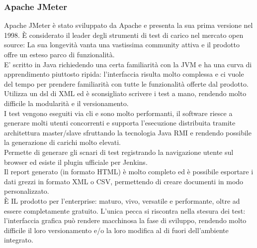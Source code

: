 \subsubsection{Apache JMeter}
Apache JMeter è stato sviluppato da Apache e presenta la sua prima versione nel 1998. È considerato il leader degli strumenti di test di carico nel mercato open source: La sua longevità vanta una vastissima community attiva e il prodotto offre un esteso parco di funzionalità.\\ 
E’ scritto in Java richiedendo una certa familiarità con la JVM e ha una curva di apprendimento piuttosto ripida: l’interfaccia risulta molto complessa e ci vuole del tempo per prendere familiarità con tutte le funzionalità offerte dal prodotto.\\
Utilizza un \gls{dsl} di XML ed è sconsigliato scrivere i test a mano, rendendo molto difficile la modularità e il versionamento.\\
I test vengono eseguiti via \gls{cli} e sono molto performanti, il software riesce a generare molti utenti concorrenti e supporta l’esecuzione distribuita tramite architettura master/slave sfruttando la tecnologia Java RMI e rendendo possibile la generazione di carichi molto elevati. \\
Permette di generare gli scnari di test registrando la navigazione utente sul browser ed esiste il plugin  ufficiale per Jenkins.\\
Il report generato (in formato HTML) è molto completo ed è possibile esportare i dati grezzi in formato XML o CSV, permettendo di creare documenti in modo personalizzato. \\
È IL prodotto per l’enterprise: maturo, vivo, versatile e performante, oltre ad essere completamente gratuito. L'unica pecca si riscontra nella stesura dei test: l'interfaccia grafica può rendere macchinosa la fase di sviluppo, rendendo molto difficile il loro versionamento e/o la loro modifica al di fuori dell'ambiente integrato.
